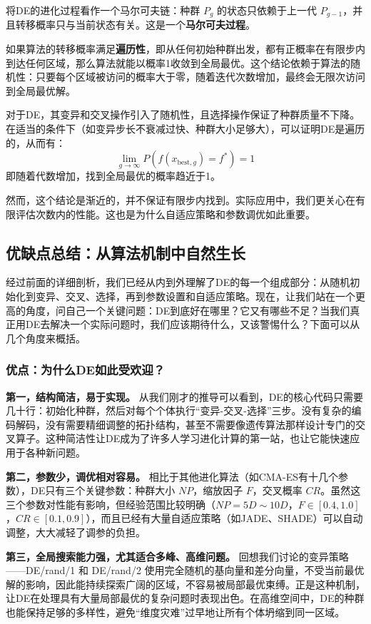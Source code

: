 \documentclass[lang=cn,zihao=-4,a4paper,fontset=windows]{beautybook}
\begin{document}
将DE的进化过程看作一个马尔可夫链：种群 $P_g$ 的状态只依赖于上一代 $P_{g-1}$，并且转移概率只与当前状态有关。这是一个\textbf{马尔可夫过程}。

如果算法的转移概率满足\textbf{遍历性}，即从任何初始种群出发，都有正概率在有限步内到达任何区域，那么算法就能以概率1收敛到全局最优。这个结论依赖于算法的随机性：只要每个区域被访问的概率大于零，随着迭代次数增加，最终会无限次访问到全局最优解。

对于DE，其变异和交叉操作引入了随机性，且选择操作保证了种群质量不下降。在适当的条件下（如变异步长不衰减过快、种群大小足够大），可以证明DE是遍历的，从而有：
\[
\lim_{g \to \infty} P(f(x_{\text{best},g}) = f^*) = 1
\]
即随着代数增加，找到全局最优的概率趋近于1。

然而，这个结论是渐近的，并不保证有限步内找到。实际应用中，我们更关心在有限评估次数内的性能。这也是为什么自适应策略和参数调优如此重要。

\subsection{优缺点总结：从算法机制中自然生长}

经过前面的详细剖析，我们已经从内到外理解了DE的每一个组成部分：从随机初始化到变异、交叉、选择，再到参数设置和自适应策略。现在，让我们站在一个更高的角度，问自己一个关键问题：DE到底好在哪里？它又有哪些不足？当我们真正用DE去解决一个实际问题时，我们应该期待什么，又该警惕什么？下面可以从几个角度来概括。

\subsubsection*{优点：为什么DE如此受欢迎？}

\textbf{第一，结构简洁，易于实现。} 从我们刚才的推导可以看到，DE的核心代码只需要几十行：初始化种群，然后对每个个体执行“变异-交叉-选择”三步。没有复杂的编码解码，没有需要精细调整的拓扑结构，甚至不需要像遗传算法那样设计专门的交叉算子。这种简洁性让DE成为了许多人学习进化计算的第一站，也让它能快速应用于各种新问题。

\textbf{第二，参数少，调优相对容易。} 相比于其他进化算法（如CMA-ES有十几个参数），DE只有三个关键参数：种群大小 $NP$，缩放因子 $F$，交叉概率 $CR$。虽然这三个参数对性能有影响，但经验范围比较明确（$NP=5D\sim10D$，$F\in[0.4,1.0]$，$CR\in[0.1,0.9]$），而且已经有大量自适应策略（如JADE、SHADE）可以自动调整，大大减轻了调参的负担。

\textbf{第三，全局搜索能力强，尤其适合多峰、高维问题。} 回想我们讨论的变异策略——DE/rand/1 和 DE/rand/2 使用完全随机的基向量和差分向量，不受当前最优解的影响，因此能持续探索广阔的区域，不容易被局部最优束缚。正是这种机制，让DE在处理具有大量局部最优的复杂问题时表现出色。在高维空间中，DE的种群也能保持足够的多样性，避免“维度灾难”过早地让所有个体坍缩到同一区域。
\end{document}

